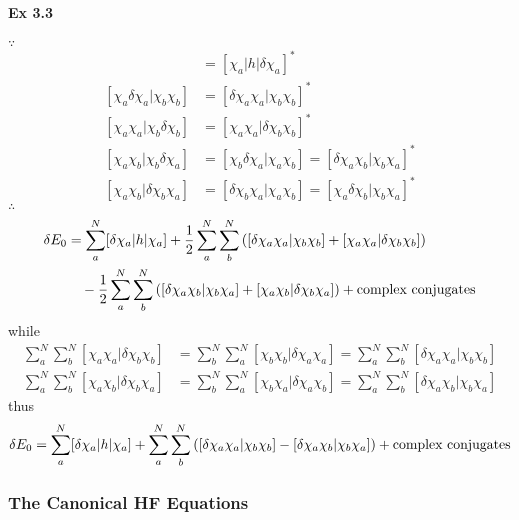 \documentclass[a4paper]{article}
\newcommand{\ex}[1]{\paragraph{Ex #1}}
\numberwithin{equation}{subsection}
\begin{document}
\ex{3.3}
$ \because $
\begin{align}
[\delta\chi_a | h | \chi_a] &= [\chi_a | h | \delta\chi_a]^*\\
[\chi_a\delta\chi_a | \chi_b\chi_b] &= [\delta\chi_a\chi_a | \chi_b\chi_b]^*\\
[\chi_a\chi_a | \chi_b\delta\chi_b] &= [\chi_a\chi_a | \delta\chi_b\chi_b]^*\\
[\chi_a\chi_b | \chi_b\delta\chi_a] &= [\chi_b\delta\chi_a | \chi_a\chi_b] = [\delta\chi_a\chi_b | \chi_b\chi_a]^*\\
[\chi_a\chi_b | \delta\chi_b\chi_a] &= [\delta\chi_b\chi_a | \chi_a\chi_b] = [\chi_a\delta\chi_b | \chi_b\chi_a]^*
\end{align}
$ \therefore $
\begin{align}
\delta E_0 &= \sum_a^N[\delta\chi_a | h | \chi_a] 
+ \dfrac{1}{2}\sum_a^N\sum_b^N \qty([\delta\chi_a\chi_a | \chi_b\chi_b] + [\chi_a\chi_a | \delta\chi_b\chi_b]) \notag\\
&\quad{} - \dfrac{1}{2}\sum_a^N\sum_b^N \qty([\delta\chi_a\chi_b | \chi_b\chi_a] + [\chi_a\chi_b | \delta\chi_b\chi_a]) + \text{complex conjugates}
\end{align}
while
\begin{align}
\sum_a^N\sum_b^N [\chi_a\chi_a | \delta\chi_b\chi_b] &= \sum_b^N\sum_a^N [\chi_b\chi_b | \delta\chi_a\chi_a] = \sum_a^N\sum_b^N [\delta\chi_a\chi_a | \chi_b\chi_b]\\
\sum_a^N\sum_b^N [\chi_a\chi_b | \delta\chi_b\chi_a] &= \sum_b^N\sum_a^N [\chi_b\chi_a | \delta\chi_a\chi_b] = \sum_a^N\sum_b^N [\delta\chi_a\chi_b | \chi_b\chi_a]
\end{align}
thus
\begin{equation}\label{key}
\delta E_0 = \sum_a^N[\delta\chi_a | h | \chi_a] 
+ \sum_a^N\sum_b^N \qty([\delta\chi_a\chi_a | \chi_b\chi_b] - [\delta\chi_a\chi_b | \chi_b\chi_a]) + \text{complex conjugates}
\end{equation}

\subsubsection{The Canonical HF Equations}
\end{document}
